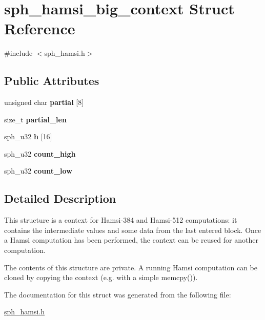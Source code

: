 \hypertarget{structsph__hamsi__big__context}{}\section{sph\+\_\+hamsi\+\_\+big\+\_\+context Struct Reference}
\label{structsph__hamsi__big__context}


{\ttfamily \#include $<$sph\+\_\+hamsi.\+h$>$}

\subsection*{Public Attributes}
\begin{DoxyCompactItemize}
\item 
\mbox{\label{structsph__hamsi__big__context_a46d565c14d01caf56b5691faf4abbe83}} 
unsigned char {\bfseries partial} \mbox{[}8\mbox{]}
\item 
\mbox{\label{structsph__hamsi__big__context_a0c4aa276101d29921ae02cb3ca43e8f6}} 
size\+\_\+t {\bfseries partial\+\_\+len}
\item 
\mbox{\label{structsph__hamsi__big__context_a91fd548b9edcd19bf53a3d5896a5d045}} 
sph\+\_\+u32 {\bfseries h} \mbox{[}16\mbox{]}
\item 
\mbox{\label{structsph__hamsi__big__context_a31d4c6979c53139e7743b8fd631da54f}} 
sph\+\_\+u32 {\bfseries count\+\_\+high}
\item 
\mbox{\label{structsph__hamsi__big__context_ac9f4f67420ac9bdfa7983d28ef6ccce7}} 
sph\+\_\+u32 {\bfseries count\+\_\+low}
\end{DoxyCompactItemize}


\subsection{Detailed Description}
This structure is a context for Hamsi-\/384 and Hamsi-\/512 computations\+: it contains the intermediate values and some data from the last entered block. Once a Hamsi computation has been performed, the context can be reused for another computation.

The contents of this structure are private. A running Hamsi computation can be cloned by copying the context (e.\+g. with a simple {\ttfamily memcpy()}). 

The documentation for this struct was generated from the following file\+:\begin{DoxyCompactItemize}
\item 
\mbox{\hyperlink{sph__hamsi_8h}{sph\+\_\+hamsi.\+h}}\end{DoxyCompactItemize}
